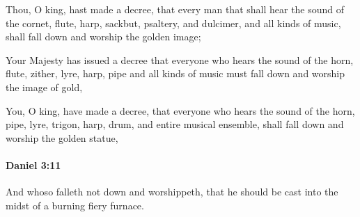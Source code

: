 			\begin{versebox}
					\item[BHS] 
					\item[LXX] 
					\item[ASV] Thou, O king, hast made a decree, that every man that shall hear the sound of the cornet, flute, harp, sackbut, psaltery, and dulcimer, and all kinds of music, shall fall down and worship the golden image;
					\item[NIV] Your Majesty has issued a decree that everyone who hears the sound of the horn, flute, zither, lyre, harp, pipe and all kinds of music must fall down and worship the image of gold,
					\item[NRSV] You, O king, have made a decree, that everyone who hears the sound of the horn, pipe, lyre, trigon, harp, drum, and entire musical ensemble, shall fall down and worship the golden statue,
			\end{versebox}

		\paragraph{Daniel 3:11} %
			\label{DANIEL-3-11}

			And whoso falleth not down and worshippeth, that he should be cast into the midst of a burning fiery furnace.

